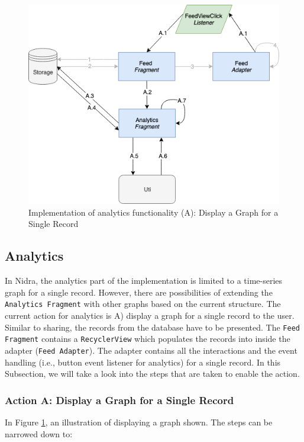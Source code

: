 
\begin{figure}
    \centering
    \includegraphics[scale=0.6]{images/Anal_Imp.png}
    \caption{Implementation of analytics functionality (A): Display a Graph for a Single Record}
    \label{fig:impl_analytics}
\end{figure}

\subsection{Analytics}
In Nidra, the analytics part of the implementation is limited to a time-series graph for a single record. However, there are possibilities of extending the \verb|Analytics Fragment| with other graphs based on the current structure. The current action for analytics is A) display a graph for a single record to the user. Similar to sharing, the records from the database have to be presented. The \verb|Feed Fragment| contains a \verb|RecyclerView| which populates the records into inside the adapter (\verb|Feed Adapter|). The adapter contains all the interactions and the event handling (i.e., button event listener for analytics) for a single record. In this Subsection, we will take a look into the steps that are taken to enable the action.

\subsubsection{Action A: Display a Graph for a Single Record}
In Figure \ref{fig:impl_analytics}, an illustration of displaying a graph shown. The steps can be narrowed down to:

